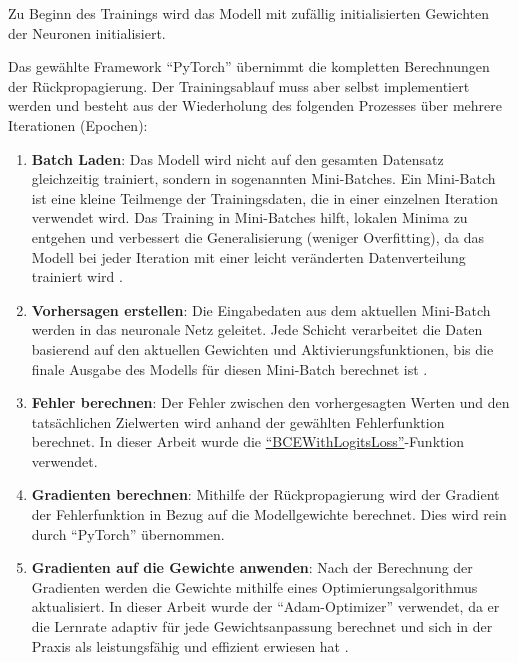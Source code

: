 Zu Beginn des Trainings wird das Modell mit zufällig initialisierten Gewichten der Neuronen initialisiert.

Das gewählte Framework \enquote{PyTorch} übernimmt die kompletten Berechnungen der Rückpropagierung. Der Trainingsablauf muss aber selbst implementiert werden und besteht aus der Wiederholung des folgenden Prozesses über mehrere Iterationen (Epochen):

\begin{enumerate}
    \item \textbf{Batch Laden}:  
    Das Modell wird nicht auf den gesamten Datensatz gleichzeitig trainiert, sondern in sogenannten Mini-Batches. Ein Mini-Batch ist eine kleine Teilmenge der Trainingsdaten, die in einer einzelnen Iteration verwendet wird. Das Training in Mini-Batches hilft, lokalen Minima zu entgehen und verbessert die Generalisierung (weniger Overfitting), da das Modell bei jeder Iteration mit einer leicht veränderten Datenverteilung trainiert wird \cite{Goodfellow2016}. %
    
    \item \textbf{Vorhersagen erstellen}:  
    Die Eingabedaten aus dem aktuellen Mini-Batch werden in das neuronale Netz geleitet. Jede Schicht verarbeitet die Daten basierend auf den aktuellen Gewichten und Aktivierungsfunktionen, bis die finale Ausgabe des Modells für diesen Mini-Batch berechnet ist \cite{Goodfellow2016}.

    \item \textbf{Fehler berechnen}:  
    Der Fehler zwischen den vorhergesagten Werten und den tatsächlichen Zielwerten wird anhand der gewählten Fehlerfunktion berechnet. In dieser Arbeit wurde die \href{https://pytorch.org/docs/stable/generated/torch.nn.BCEWithLogitsLoss.html}{\enquote{BCEWithLogitsLoss}}-Funktion verwendet. 

    \item \textbf{Gradienten berechnen}:  
    Mithilfe der Rückpropagierung wird der Gradient der Fehlerfunktion in Bezug auf die Modellgewichte berechnet. Dies wird rein durch \enquote{PyTorch} übernommen. 

    \item \textbf{Gradienten auf die Gewichte anwenden}:  
    Nach der Berechnung der Gradienten werden die Gewichte mithilfe eines Optimierungsalgorithmus aktualisiert. In dieser Arbeit wurde der \enquote{Adam-Optimizer} verwendet, da er die Lernrate adaptiv für jede Gewichtsanpassung berechnet und sich in der Praxis als leistungsfähig und effizient erwiesen hat \cite{Kingma2015}.
\end{enumerate}

